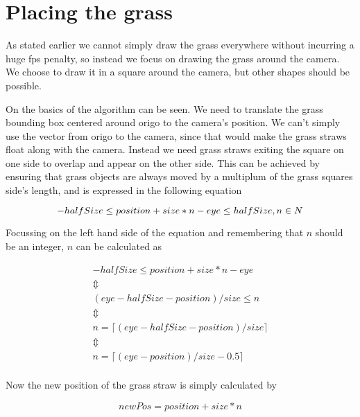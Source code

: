 \section{Placing the grass}

As stated earlier we cannot simply draw the grass everywhere without
incurring a huge fps penalty, so instead we focus on drawing the grass
around the camera. We choose to draw it in a square around the camera,
but other shapes should be possible.


On  the basics of the algorithm can be
seen. We need to translate the grass bounding box centered around
origo to the camera's position. We can't simply use the vector from
origo to the camera, since that would make the grass straws float
along with the camera. Instead we need grass straws exiting the square
on one side to overlap and appear on the other side. This can be
achieved by ensuring that grass objects are always moved by a
multiplum of the grass squares side's length, and is expressed in the
following equation

\begin{displaymath}
    -halfSize \le position + size * n - eye \le halfSize, n \in N \\
\end{displaymath}

Focussing on the left hand side of the equation and remembering that
$n$ should be an integer, $n$ can be calculated as 

\begin{displaymath}
  \begin{array}{l}
    -halfSize \le position + size * n - eye \\
    \Updownarrow \\
    (eye - halfSize - position) / size \le n \\
    \Updownarrow \\
    n = \lceil (eye - halfSize - position) / size \rceil \\
    \Updownarrow \\
    n = \lceil (eye - position) / size - 0.5 \rceil \\
  \end{array}
\end{displaymath}

Now the new position of the grass straw is simply calculated by 

\begin{displaymath}
  newPos = position + size * n
\end{displaymath}

